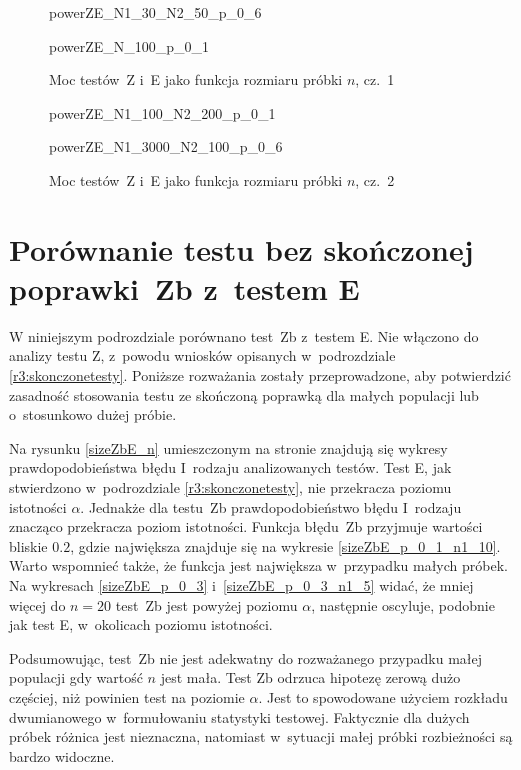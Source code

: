 \begin{figure}[p]
	\begin{subdiagram}{powerZE_N1_30_N2_50_p_0_6}
	\end{subdiagram}
	\begin{subdiagram}{powerZE_N_100_p_0_1}
	\end{subdiagram}
	
	\caption{Moc testów~Z i~E jako funkcja rozmiaru próbki $n$, cz.~1}
	\label{powerZE_n1}
\end{figure}

\begin{figure}[p]
	\begin{subdiagram}{powerZE_N1_100_N2_200_p_0_1}
	\end{subdiagram}
	\begin{subdiagram}{powerZE_N1_3000_N2_100_p_0_6}
	\end{subdiagram}
	
	\caption{Moc testów~Z i~E jako funkcja rozmiaru próbki $n$, cz.~2}
	\label{powerZE_n2}
\end{figure}

\section{Porównanie testu bez skończonej poprawki~Zb z~testem E}

W niniejszym podrozdziale porównano test~Zb z~testem E. Nie włączono do analizy testu Z, z~powodu wniosków opisanych w~podrozdziale \ref{r3:skonczonetesty}. Poniższe rozważania zostały przeprowadzone, aby potwierdzić zasadność stosowania testu ze skończoną poprawką dla małych populacji lub o~stosunkowo dużej próbie.

Na rysunku \ref{sizeZbE_n} umieszczonym na stronie \pageref{sizeZbE_n} znajdują się wykresy prawdopodobieństwa błędu I~rodzaju analizowanych testów. Test E, jak stwierdzono w~podrozdziale \ref{r3:skonczonetesty}, nie przekracza poziomu istotności $\alpha$. Jednakże dla testu~Zb prawdopodobieństwo błędu I~rodzaju znacząco przekracza poziom istotności. Funkcja błędu~Zb przyjmuje wartości bliskie $0.2$, gdzie największa znajduje się na wykresie \ref{sizeZbE_p_0_1_n1_10}. Warto wspomnieć także, że funkcja jest największa w~przypadku małych próbek. Na wykresach \ref{sizeZbE_p_0_3} i~\ref{sizeZbE_p_0_3_n1_5} widać, że mniej więcej do $n=20$ test~Zb jest powyżej poziomu $\alpha$, następnie oscyluje, podobnie jak test E, w~okolicach poziomu istotności. 

Podsumowując, test~Zb nie jest adekwatny do rozważanego przypadku małej populacji gdy wartość $n$ jest mała. Test Zb odrzuca hipotezę zerową dużo częściej, niż powinien test na poziomie $\alpha$. Jest to spowodowane użyciem rozkładu dwumianowego w~formułowaniu statystyki testowej. Faktycznie dla dużych próbek różnica jest nieznaczna, natomiast w~sytuacji małej próbki rozbieżności są bardzo widoczne.

